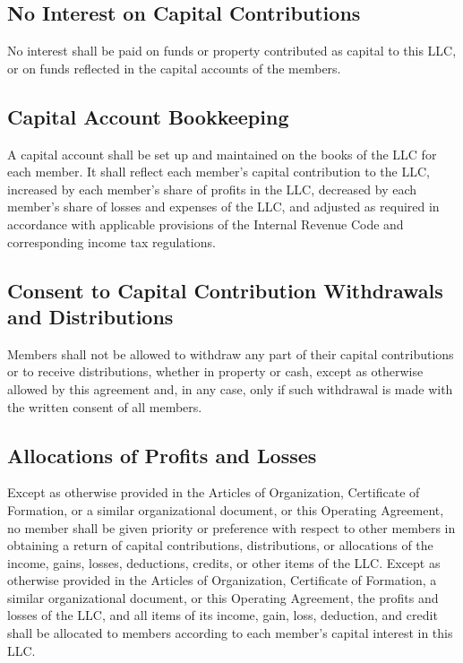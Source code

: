 \documentclass{article}
\begin{document}
			\subsection{No Interest on Capital Contributions}
			No interest shall be paid on funds or property contributed as capital to this LLC, or on funds reflected in the capital accounts of the members.

			\subsection{Capital Account Bookkeeping}
			A capital account shall be set up and maintained on the books of the LLC for each member. It shall reflect each member's capital contribution to the LLC, increased by each member's share of profits in the LLC, decreased by each member's share of losses and expenses of the LLC, and adjusted as required in accordance with applicable provisions of the Internal Revenue Code and corresponding income tax regulations.

			\subsection{Consent to Capital Contribution Withdrawals and Distributions}
			Members shall not be allowed to withdraw any part of their capital contributions or to receive distributions, whether in property or cash, except as otherwise allowed by this agreement and, in any case, only if such withdrawal is made with the written consent of all members.

			\subsection{Allocations of Profits and Losses}
			Except as otherwise provided in the Articles of Organization, Certificate of Formation, or a similar organizational document, or this Operating Agreement, no member shall be given priority or preference with respect to other members in obtaining a return of capital contributions, distributions, or allocations of the income, gains, losses, deductions, credits, or other items of the LLC. Except as otherwise provided in the Articles of Organization, Certificate of Formation, a similar organizational document, or this Operating Agreement, the profits and losses of the LLC, and all items of its income, gain, loss, deduction, and credit shall be allocated to members according to each member's capital interest in this LLC.
\end{document}
